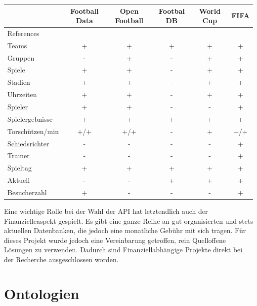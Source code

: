 \documentclass[runningheads,a4paper]{llncs}
\begin{document}
\begin{center}

\begin{tabular}{|l|c|c|c|c|c|}   \hline 
 & Football Data 	& Open Football 	& Footbal DB  &	World Cup  & FIFA  \\ \hline
References & \cite{url_footballdata} & \cite{url_openfootball} &  \cite{url_footballdb} &
 \cite{url_worldcup} & \cite{url_fifa} \\ \hline
 
Teams				& + & + & +	& + & +		\\ \hline
Gruppen				& - & + & -	& + & +		\\ \hline
Spiele				& + & + & -	& + & +		\\ \hline
Stadien				& + & + & -	& + & +		\\ \hline
Uhrzeiten			& + & + & -	& + & +		\\ \hline
Spieler				& + & + & - & - & +		\\ \hline
Spielergebnisse		& + & + & + & + & + 		\\ \hline
Torschützen/min		& +/+ & 	+/+ & - & + & +/+ 	\\ \hline
Schiedsrichter		& - & - & - & - & +		\\ \hline
Trainer				& - & - & - & - & +		\\ \hline
Spieltag 			& + & + & + & + & +		\\ \hline
Aktuell				& - & - & + & + & +  \\ \hline
Besucherzahl			& + & - & - & - & +		\\ \hline
			 
\end{tabular}


\end{center}


Eine wichtige Rolle bei der Wahl der API hat letztendlich auch der Finanzielleaspekt gespielt. Es gibt eine ganze Reihe an gut organisierten und stets aktuellen Datenbanken, die jedoch eine monatliche Gebühr mit sich tragen. Für dieses Projekt wurde jedoch eine Vereinbarung getroffen, rein Quelloffene Lösungen zu verwenden. Dadurch sind Finanziellabhängige Projekte direkt bei der Recherche ausgeschlossen worden. 
  
\newpage
\section{Ontologien}
\end{document}
